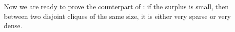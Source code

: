 \documentclass[11pt]{article}
\theoremstyle{plain}
\newtheorem{lemma}[theorem]{Lemma}
\theoremstyle{definition}
\DeclareMathOperator{\surp}{surp}
\begin{document}




Now we are ready to prove the counterpart of : if the surplus is small, then between two disjoint cliques of the same size, it is either very sparse or very dense.
\end{document}

